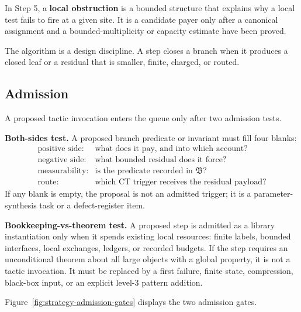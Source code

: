 \documentclass[
  11pt,
]{article}
\theoremstyle{definition}
\begin{document}
In Step 5, a \textbf{local obstruction} is a bounded structure that
explains why a local test fails to fire at a given site.  It is a
candidate payer only after a canonical assignment and a
bounded-multiplicity or capacity estimate have been proved.

The algorithm is a design discipline. A step closes a branch when it
produces a closed leaf or a residual that is smaller, finite, charged,
or routed.

\subsection{Admission}\label{admission}

A proposed tactic invocation enters the queue only after two admission
tests.

\textbf{Both-sides test.} A proposed branch predicate or invariant must
fill four blanks:
\[
\begin{array}{ll}
\text{positive side:} & \text{what does it pay, and into which account?}\\
\text{negative side:} & \text{what bounded residual does it force?}\\
\text{measurability:} & \text{is the predicate recorded in }\mathfrak B?\\
\text{route:} & \text{which CT trigger receives the residual payload?}
\end{array}
\]
If any blank is empty, the proposal is not an admitted trigger; it is a
parameter-synthesis task or a defect-register item.

\textbf{Bookkeeping-vs-theorem test.} A proposed step is admitted as a
library instantiation only when it spends existing local resources:
finite labels, bounded interfaces, local exchanges, ledgers, or
recorded budgets. If the step requires an unconditional theorem about
all large objects with a global property, it is not a tactic invocation.
It must be replaced by a first failure, finite state, compression,
black-box input, or an explicit level-3 pattern addition.

Figure~\ref{fig:strategy-admission-gates} displays the two admission
gates.
\end{document}
